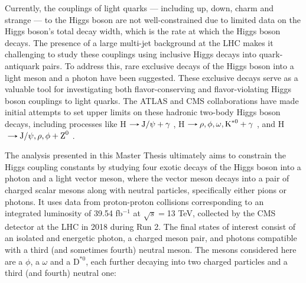 Currently, the couplings of light quarks --- including up, down, charm and strange --- to the Higgs boson are not well-constrained due to limited data on the Higgs boson's total decay width, which is the rate at which the Higgs boson decays. The presence of a large multi-jet background at the LHC makes it challenging to study these couplings using inclusive Higgs decays into quark-antiquark pairs. To address this, rare exclusive decays of the Higgs boson into a light meson and a photon have been suggested. These exclusive decays serve as a valuable tool for investigating both flavor-conserving and flavor-violating Higgs boson couplings to light quarks. The ATLAS and CMS collaborations have made initial attempts to set upper limits on these hadronic two-body Higgs boson decays, including processes like H$\decaysto \text{J}/\psi + \gamma$ \cite{ATLAS:2022rej, CMS:2018gcm}, H$\decaysto \rho,\phi,\omega,\text{K}^{*0} + \gamma$ \cite{ATLAS:2017gko, ATLAS:2023alf}, and H$\decaysto \text{J}/\psi,\rho,\phi + \text{Z}^0$ \cite{CMS:2022fsq, CMS:2020ggo}.

The analysis presented in this Master Thesis ultimately aims to constrain the Higgs coupling constants by studying four exotic decays of the Higgs boson into a photon and a light vector meson, where the vector meson decays into a pair of charged scalar mesons along with neutral particles, specifically either pions or photons. It uses data from proton-proton collisions corresponding to an integrated luminosity of 39.54 fb$^{-1}$ at $\sqrt{s}=$13 TeV, collected by the CMS detector at the LHC in 2018 during Run 2. The final states of interest consist of an isolated and energetic photon, a charged meson pair, and photons compatible with a third (and sometimes fourth) neutral meson. The mesons considered here are a $\phi$, a $\omega$ and a $\text{D}^{*0}$, each further decaying into two charged particles and a third (and fourth) neutral one:

